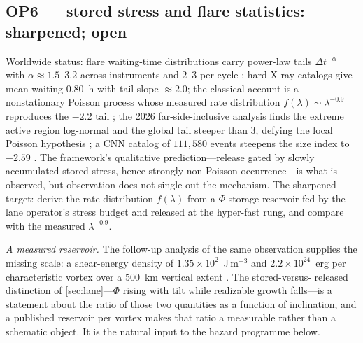 \documentclass[11pt]{article}
\renewcommand{\S}{\mathhexbox278}
\theoremstyle{definition}
\theoremstyle{remark}
\begin{document}
\subsection*{OP6 --- stored stress and flare statistics: sharpened; open}
Worldwide status: flare waiting-time distributions carry power-law tails
$\Delta t^{-\alpha}$ with $\alpha\approx1.5$--$3.2$ across instruments and
$2$--$3$ per cycle \cite{aschrev,biasiotti}; hard X-ray catalogs give mean
waiting $0.80$~h with tail slope $\approx2.0$; the classical account is a
nonstationary Poisson process whose measured rate distribution
$f(\lambda)\sim\lambda^{-0.9}$ reproduces the $-2.2$ tail \cite{wheatland};
the 2026 far-side-inclusive analysis finds the extreme active region
log-normal and the global tail steeper than $3$, defying the local Poisson
hypothesis \cite{wtd2026}; a CNN catalog of $111{,}580$ events steepens the
size index to $-2.59$ \cite{cnncat}. The framework's qualitative
prediction---release gated by slowly accumulated stored stress, hence
strongly non-Poisson occurrence---is what is observed, but observation does
not single out the mechanism. The sharpened target: derive the rate
distribution $f(\lambda)$ from a $\Phi$-storage reservoir fed by the lane
operator's stress budget and released at the hyper-fast rung, and compare
with the measured $\lambda^{-0.9}$.

\emph{A measured reservoir.} The follow-up analysis of the same observation
supplies the missing scale: a shear-energy density of
$1.35\times10^{2}$~J\,m$^{-3}$ and $2.2\times10^{24}$~erg per characteristic
vortex over a $500$~km vertical extent \cite{nykyri}. The stored-versus-
released distinction of \S\ref{sec:lane}---$\Phi$ rising with tilt while
realizable growth falls---is a statement about the ratio of those two
quantities as a function of inclination, and a published reservoir per vortex
makes that ratio a measurable rather than a schematic object. It is the
natural input to the hazard programme below.
\end{document}
